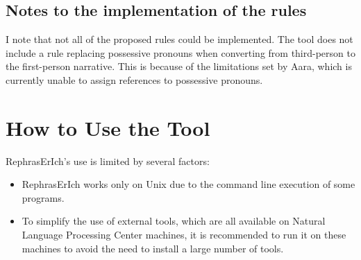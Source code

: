 \subsection*{Notes to the implementation of the rules}

I note that not all of the proposed rules could be implemented. The tool does not include a rule replacing possessive pronouns when converting from third-person to the first-person narrative. This is because of the limitations set by Aara, which is currently unable to assign references to possessive pronouns.

\section{How to Use the Tool}

RephrasErIch's use is limited by several factors:

\begin{itemize}
	\item RephrasErIch works only on Unix due to the command line execution of some programs.
	\item To simplify the use of external tools, which are all available on Natural Language Processing Center machines, it is recommended to run it on these machines to avoid the need to install a large number of tools.
\end{itemize}
